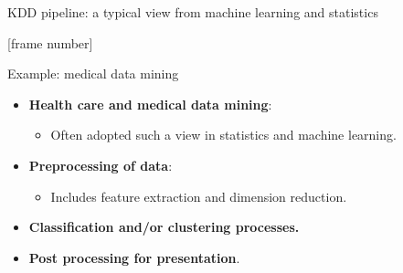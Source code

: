 \documentclass[aspectratio=169,t]{beamer}
\begin{document}
{\begin{frame}{KDD pipeline: a typical view from machine learning and statistics}
    \end{frame}
  }

  {
    [frame number]
    \begin{frame}{Example: medical data mining}
    \begin{itemize}
        \item \textbf{Health care and medical data mining}:
        \begin{itemize}
            \item Often adopted such a view in statistics and machine learning.
        \end{itemize}
        \item \textbf{Preprocessing of data}:
        \begin{itemize}
            \item Includes feature extraction and dimension reduction.
        \end{itemize}
        \item \textbf{Classification and/or clustering processes.}
        \item \textbf{Post processing for presentation}.
    \end{itemize}
    \end{frame}
  }
\end{document}
